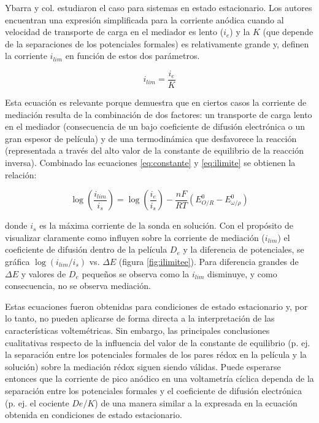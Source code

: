 		Ybarra y col.\cite{ybarra2008} estudiaron el caso para sistemas en estado estacionario. Los autores encuentran una expresión simplificada para la corriente anódica cuando al velocidad de transporte de carga en el mediador es lento ($i_e$) y la $K$ (que depende de la separaciones de los potenciales formales) es relativamente grande y, definen la corriente $i_{lim}$ en función de estos dos parámetros.

		\begin{equation}
		i_{lim}=\frac{i_e}{K}
		\label{eq:ilimite}
		\end{equation}

		Esta ecuación es relevante porque demuestra que en ciertos casos la corriente de mediación resulta de la combinación de dos factores: un transporte de carga lento en el mediador (consecuencia de un bajo coeficiente de difusión electrónica o un gran espesor de película) y de una termodinámica que desfavorece la reacción (representada a través del alto valor de la constante de equilibrio de la reacción inversa).\cite{ybarra2005}
		Combinado las ecuaciones \ref{eq:constante} y \ref{eq:ilimite} se obtienen la relación:

		\begin{equation}
			\log\left({\frac{i_{lim}}{i_s}}\right) =\log\left({\frac{i_e}{i_s}}\right)-{\frac{nF}{RT}}\left( E^0_{O/R} - E^0_{\omega / \rho} \right)
			\label{eq:delgrafico}
		\end{equation}

		\noindent donde $i_s$ es la máxima corriente de la sonda en solución. Con el propósito de visualizar claramente como influyen sobre la corriente de mediación ($i_{lim}$) el coeficiente de difusión dentro de la película $D_e$ y la diferencia de potenciales, se gráfica $\log(i_{lim}/i_{s})$ vs. $\Delta E$ (figura \ref{fig:ilimitee}). Para diferencia grandes de $\Delta E$ y valores de $D_e$ pequeños se observa como la $i_{lim}$ disminuye, y como consecuencia, no se observa mediación.

		Estas ecuaciones fueron obtenidas para condiciones de estado estacionario y, por lo tanto, no pueden aplicarse de forma directa a la interpretación de las características voltemétricas. Sin embargo, las principales conclusiones cualitativas respecto de la influencia del valor de la constante de equilibrio (p. ej. la separación entre los potenciales formales de los pares rédox en la película y la solución) sobre la mediación rédox siguen siendo válidas. Puede esperarse entonces que la corriente de pico anódico en una voltametría cíclica dependa de la separación entre los potenciales formales y el coeficiente de difusión electrónica (p. ej. el cociente $De/K$) de una manera similar a la expresada en la ecuación obtenida en condiciones de estado estacionario. 
		
